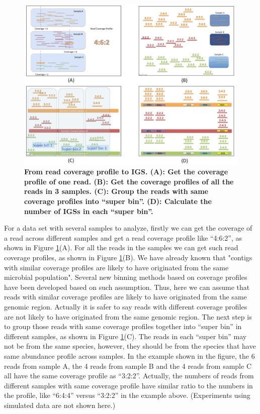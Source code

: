 \documentclass{article}
\begin{document}
\begin{figure}[!ht]
 \centerline{\includegraphics[width=6in]{./figures/coverage_profile.png}}
 \caption{\bf From read coverage profile to IGS. (A): Get the coverage profile of one read. (B): Get the coverage
 profiles of all the reads in 3 samples. (C): Group the reads with same coverage profiles into ``super bin''. 
 (D): Calculate the number of IGSs in each ``super bin''.}
\label{fig:coverage_profile}
\end{figure}

For a data set with several samples to analyze, firstly we can get the coverage of a read across different samples and get a read coverage
profile like ``4:6:2'', as shown in Figure \ref{fig:coverage_profile}(A). 
For all the reads in the samples we can get such read coverage profiles, as 
shown in Figure \ref{fig:coverage_profile}(B). 
We have already known that "contigs with similar coverage profiles are likely
to have originated from the same microbial population"\cite{Imelfort2014}.
Several new binning methods based on coverage profiles have been developed
based on such assumption\cite{Albertsen2013,Karlsson2013,Alneberg2014,Nielsen2014,Imelfort2014}.
Thus, here we can assume that reads with similar coverage profiles are 
likely to have originated from the same genomic region. Actually it is safer to 
say reads with different coverage profiles are not likely to have originated from
the same genomic region. The next step is to group those reads with same
coverage profiles together into ``super bin'' in different samples, as shown 
in Figure \ref{fig:coverage_profile}(C). The reads in each ``super bin'' may 
not be from the same species, however, they should be from the species that have
same abundance profile across samples. In the example shown in the figure,
the 6 reads from sample A, the 4 reads from sample B and the 4 reads from
sample C all have the same coverage profile as ``3:2:2''. Actually, the 
numbers of reads from different samples with same coverage profile have 
similar ratio to the numbers in the profile, like ``6:4:4''
versus ``3:2:2'' in the example above. (Experiments using simulated data are not
shown here.)
 
\end{document}
